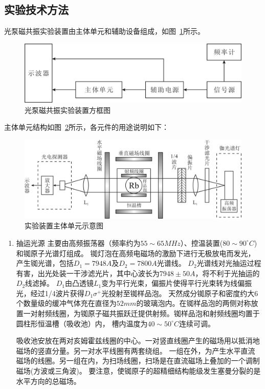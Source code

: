\documentclass[11pt,a4paper]{article}
\begin{document}
\begin{spacing}{1.3}
\begin{CJK*}{UTF8}{gbsn}
\section{实验技术方法}
光泵磁共振实验装置由主体单元和辅助设备组成，如图~\ref{fig2-6-3}所示。
\begin{figure}[h!]
\centering
\includegraphics[width=.6\textwidth]{fig2-6-3}
\caption{光泵磁共振实验装置方框图}
\label{fig2-6-3}
\end{figure} 
\par 
主体单元结构如图~\ref{fig2-6-4}所示，各元件的用途说明如下：
\begin{figure}[!h]
\centering
\includegraphics[width=.8\textwidth]{fig2-6-4}
\caption{实验装置主体单元示意图}
\label{fig2-6-4}
\end{figure} 
\begin{enumerate}
\item 抽运光源  主要由高频振荡器（频率约为$55\sim65 MHz$）、控温装置($80\sim90^{\circ}C$)和铷原子光谱灯组成。
铷灯泡在高频电磁场的激励下进行无极放电而发光，产生铷光谱，包括$D_1=7948A$及$D_2=7800A$光谱线。
$D_2$光谱线对光抽运过程有害，出光处装一干涉滤光片，其中心波长为$7948\pm50A$，将不利于光抽运的$D_2$线滤掉。
$D_1$由凸透镜$L_1$变为平行光束，偏振片使得平行光束转为线偏振光，经过1/4波片获得$D_1\sigma ^+$光投射至铷样品泡。
  天然成分铷原子和密度约大6个数量级的缓冲气体充在直径为$52mm$的玻璃泡内。在铷样品泡的两侧对称放
置一对射频线圈，为铷原子磁共振跃迁提供射频。铷样品泡和射频线圈均置于圆柱形恒温槽（吸收池）内，
槽内温度为$40\sim 50^{\circ}C$连续可调。\par
吸收池安放在两对亥姆霍兹线圈的中心。一对竖直线圈产生的磁场用以抵消地磁场的竖直分量。另一对水平线圈有两套绕组。
一组在外，为产生水平直流磁场的线圈。另一组在内，为扫场线圈，扫场是在直流磁场上叠加的一个调制磁场(方波或三角波)。
要注意，使铷原子的超精细结构能级发生塞曼分裂的是水平方向的总磁场。\par

\end{enumerate}
\end{CJK*}
\end{spacing}
\end{document}

